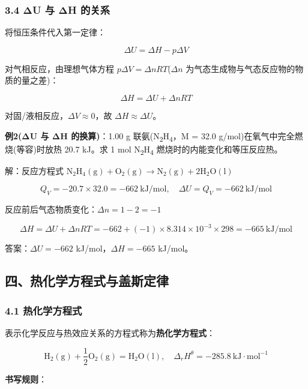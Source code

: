 \documentclass[a4paper,11pt]{ctexart}
\newcommand{\箭}{\ensuremath{\rightarrow}}
\newcommand{\左箭}{\ensuremath{\leftarrow}}
\newcommand{\上箭}{\ensuremath{\uparrow}}
\newcommand{\下箭}{\ensuremath{\downarrow}}
\newcommand{\衡}{\ensuremath{\rightleftharpoons}}
\newcommand{\双箭}{\ensuremath{\leftrightarrow}}
\newcommand{\约等于}{\ensuremath{\approx}}
\newcommand{\小于等于}{\ensuremath{\leq}}
\newcommand{\大于等于}{\ensuremath{\geq}}
\newcommand{\不等于}{\ensuremath{\neq}}
\newcommand{\西格马}{\ensuremath{\sigma}}
\newcommand{\派}{\ensuremath{\pi}}
\begin{document}
\subsubsection{3.4 ΔU 与 ΔH 的关系}\label{ux3b4u-ux4e0e-ux3b4h-ux7684ux5173ux7cfb}

将恒压条件代入第一定律：

\[
\Delta U = \Delta H - p\Delta V
\]

对气相反应，由理想气体方程 \(p\Delta V = \Delta nRT\)(\(\Delta n\) 为气态生成物与气态反应物的物质的量之差)：

\[
\boxed{\Delta H = \Delta U + \Delta nRT}
\]

对固/液相反应，\(\Delta V \approx 0\)，故 \(\Delta H \approx \Delta U\)。

\textbf{例2(ΔU 与 ΔH 的换算)}：1.00 g 联氨(N\textsubscript{2}H\textsubscript{4}，M = 32.0 g/mol)在氧气中完全燃烧(等容)时放热 20.7 kJ。求 1 mol N\textsubscript{2}H\textsubscript{4} 燃烧时的内能变化和等压反应热。

解：反应方程式 \(\mathrm{N_2H_4(g) + O_2(g) \to N_2(g) + 2H_2O(l)}\)

\[Q_V = -20.7 \times 32.0 = -662\ \mathrm{kJ/mol}, \quad \Delta U = Q_V = -662\ \mathrm{kJ/mol}\]

反应前后气态物质变化：\(\Delta n = 1 - 2 = -1\)

\[\Delta H = \Delta U + \Delta nRT = -662 + (-1) \times 8.314 \times 10^{-3} \times 298 = -665\ \mathrm{kJ/mol}\]

答案：\(\Delta U = -662\) kJ/mol，\(\Delta H = -665\) kJ/mol。

\subsection{四、热化学方程式与盖斯定律}\label{ux56dbux70edux5316ux5b66ux65b9ux7a0bux5f0fux4e0eux76d6ux65afux5b9aux5f8b}

\subsubsection{4.1 热化学方程式}\label{ux70edux5316ux5b66ux65b9ux7a0bux5f0f}

表示化学反应与热效应关系的方程式称为\textbf{热化学方程式}：

\[
\mathrm{H_2(g) + \frac{1}{2}O_2(g) = H_2O(l)}, \quad \Delta_r H^\theta = -285.8\ \mathrm{kJ \cdot mol^{-1}}
\]

\textbf{书写规则}：
\end{document}
